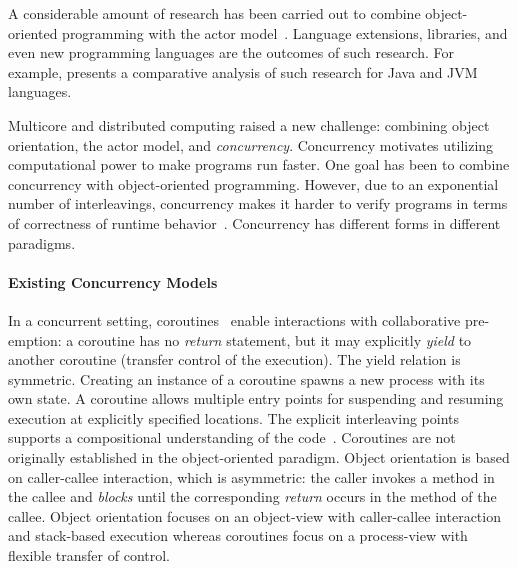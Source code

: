 A considerable amount of research has been carried out to combine object-oriented programming with the actor model~\cite{philippsen2000survey}. 
Language extensions, libraries, and even new programming languages are the  outcomes of such research.
For example, \cite{actor_frameworks_jvm:agha} presents a comparative analysis of such research for Java and JVM languages.

Multicore and distributed computing raised a new challenge: combining object orientation, the actor model, and \emph{concurrency}.
Concurrency motivates utilizing computational power to make programs run faster.
One goal has been to combine concurrency with object-oriented programming.
However, due to an exponential number of interleavings, concurrency makes it harder to verify programs in terms of correctness of runtime behavior~\cite{Herlihy:1990:linear,johnsen:history,agha:predictive:safety}. 
Concurrency has different forms in different paradigms.

\paragraph*{Existing Concurrency Models}
In a concurrent setting, coroutines~\cite{conway1963design,taocp:knuth} enable interactions with collaborative pre-emption:
a coroutine has no \emph{return} statement, but it may explicitly \emph{yield}
to another coroutine (transfer control of the execution).
The yield relation is symmetric. 
Creating an instance of a coroutine spawns a new process with its own state.
A coroutine allows multiple entry points for suspending and resuming execution at explicitly specified locations.
The explicit interleaving points supports a compositional understanding of the code~\cite{DBLP:journals/cacm/Hoare74}.
Coroutines are not originally established in the object-oriented paradigm.
Object orientation is based on caller-callee interaction, which is asymmetric:
the caller invokes a method in the callee and \emph{blocks} until the
corresponding \emph{return} occurs in the method of the callee.
Object orientation focuses on an object-view with caller-callee interaction and stack-based execution whereas coroutines focus on a process-view with flexible transfer of control.

